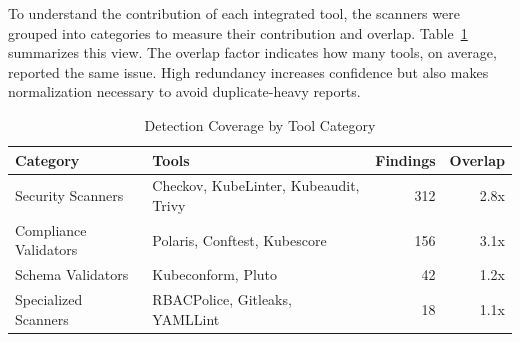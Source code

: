 \documentclass[preprint,12pt]{elsarticle}
\newcommand{\new}[1]{#1}
\begin{document}
\new{To understand the contribution of each integrated tool, the scanners were grouped into categories to measure their contribution and overlap. Table~\ref{tab:tool_performance} summarizes this view. The overlap factor indicates how many tools, on average, reported the same issue. High redundancy increases confidence but also makes normalization necessary to avoid duplicate-heavy reports.}


\begin{table}[htbp]
\centering
\caption{Detection Coverage by Tool Category}
\label{tab:tool_performance}
\small
\setlength{\tabcolsep}{5pt}
\renewcommand{\arraystretch}{1.1}
\begin{tabular}{lp{4cm}rr}
\hline
\textbf{Category} & \textbf{Tools} & \textbf{Findings} & \textbf{Overlap} \\
\hline
Security Scanners & Checkov, KubeLinter, Kubeaudit, Trivy & 312 & 2.8x \\
Compliance Validators & Polaris, Conftest, Kubescore & 156 & 3.1x \\
Schema Validators & Kubeconform, Pluto & 42 & 1.2x \\
Specialized Scanners & RBACPolice, Gitleaks, YAMLLint & 18 & 1.1x \\
\hline
\end{tabular}
\end{table}
\end{document}
